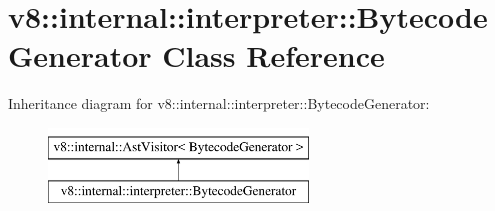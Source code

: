 \hypertarget{classv8_1_1internal_1_1interpreter_1_1BytecodeGenerator}{}\section{v8\+:\+:internal\+:\+:interpreter\+:\+:Bytecode\+Generator Class Reference}
\label{classv8_1_1internal_1_1interpreter_1_1BytecodeGenerator}
Inheritance diagram for v8\+:\+:internal\+:\+:interpreter\+:\+:Bytecode\+Generator\+:\begin{figure}[H]
\begin{center}
\leavevmode
\includegraphics[height=2.000000cm]{classv8_1_1internal_1_1interpreter_1_1BytecodeGenerator}
\end{center}
\end{figure}
